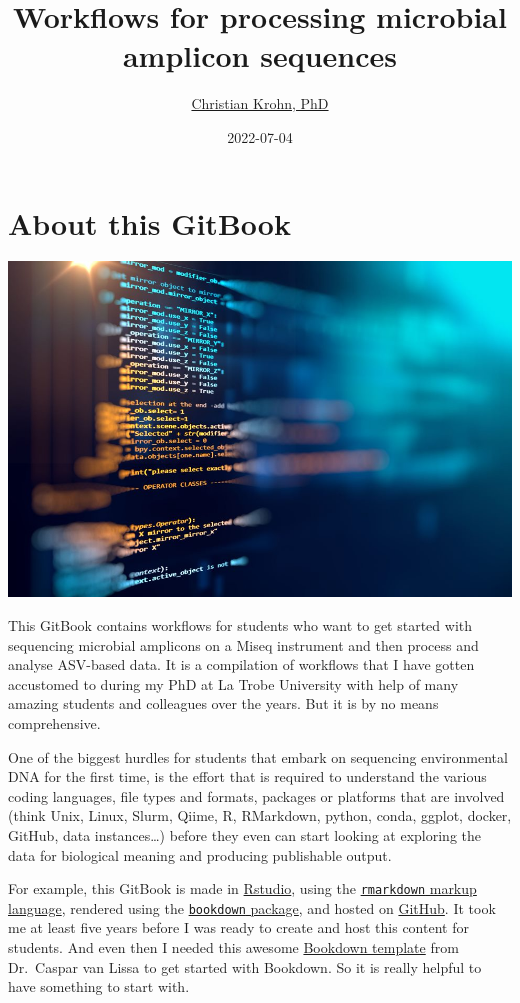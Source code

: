 \documentclass[
]{book}
\title{Workflows for processing microbial amplicon sequences}
\author{\href{https://www.rmit.edu.au/contact/staff-contacts/academic-staff/k/krohn---christian}{Christian Krohn, PhD}}
\date{2022-07-04}
\begin{document}
\maketitle

{
\setcounter{tocdepth}{1}
\tableofcontents
}
\hypertarget{about-this-gitbook}{%
\chapter{About this GitBook}\label{about-this-gitbook}}

\includegraphics{./img/data.jpeg}

This GitBook contains workflows for students who want to get started with sequencing microbial amplicons on a Miseq instrument and then process and analyse ASV-based data. It is a compilation of workflows that I have gotten accustomed to during my PhD at La Trobe University with help of many amazing students and colleagues over the years. But it is by no means comprehensive.

One of the biggest hurdles for students that embark on sequencing environmental DNA for the first time, is the effort that is required to understand the various coding languages, file types and formats, packages or platforms that are involved (think Unix, Linux, Slurm, Qiime, R, RMarkdown, python, conda, ggplot, docker, GitHub, data instances\ldots) before they even can start looking at exploring the data for biological meaning and producing publishable output.

For example, this GitBook is made in \href{https://rstudio.com}{Rstudio}, using the \href{https://rstudio.com/wp-content/uploads/2016/03/rmarkdown-cheatsheet-2.0.pdf}{\texttt{rmarkdown} markup language}, rendered using the \href{https://bookdown.org/yihui/bookdown/get-started.html}{\texttt{bookdown} package}, and hosted on \href{https://github.com/}{GitHub}. It took me at least five years before I was ready to create and host this content for students. And even then I needed this awesome \href{https://cjvanlissa.github.io/gitbook-demo/index.html}{Bookdown template} from Dr.~Caspar van Lissa to get started with Bookdown. So it is really helpful to have something to start with.
\end{document}
